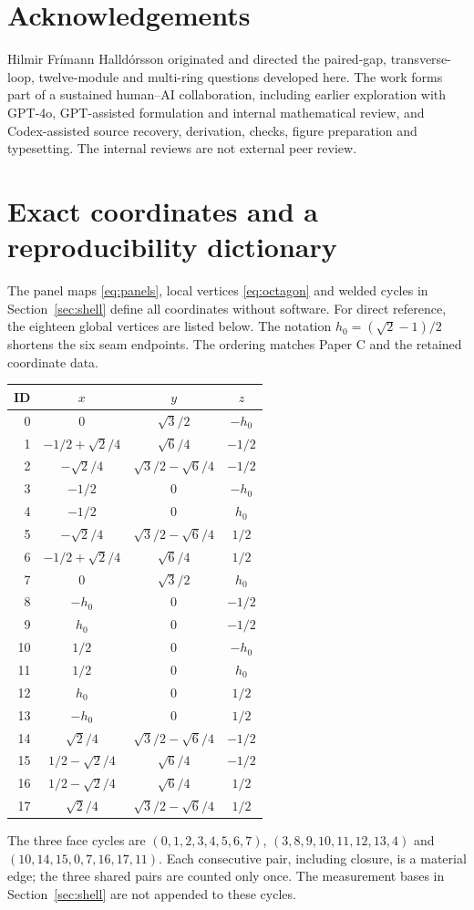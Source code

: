 \section*{Acknowledgements}
Hilmir Fr\'imann Halld\'orsson originated and directed the paired-gap, transverse-loop, twelve-module and multi-ring questions developed here. The work forms part of a sustained human--AI collaboration, including earlier exploration with GPT-4o, GPT-assisted formulation and internal mathematical review, and Codex-assisted source recovery, derivation, checks, figure preparation and typesetting. The internal reviews are not external peer review.

\appendix
\section{Exact coordinates and a reproducibility dictionary}\label{app:coords}
The panel maps \eqref{eq:panels}, local vertices \eqref{eq:octagon} and welded cycles in Section~\ref{sec:shell} define all coordinates without software. For direct reference, the eighteen global vertices are listed below. The notation $h_0=(\sqrt2-1)/2$ shortens the six seam endpoints. The ordering matches Paper C and the retained coordinate data.
\begin{center}\small
\begin{tabular}{@{}rccc@{}}\toprule
ID & $x$ & $y$ & $z$\\\midrule
0 & $0$ & $\sqrt3/2$ & $-h_0$\\
1 & $-1/2+\sqrt2/4$ & $\sqrt6/4$ & $-1/2$\\
2 & $-\sqrt2/4$ & $\sqrt3/2-\sqrt6/4$ & $-1/2$\\
3 & $-1/2$ & $0$ & $-h_0$\\
4 & $-1/2$ & $0$ & $h_0$\\
5 & $-\sqrt2/4$ & $\sqrt3/2-\sqrt6/4$ & $1/2$\\
6 & $-1/2+\sqrt2/4$ & $\sqrt6/4$ & $1/2$\\
7 & $0$ & $\sqrt3/2$ & $h_0$\\
8 & $-h_0$ & $0$ & $-1/2$\\
9 & $h_0$ & $0$ & $-1/2$\\
10 & $1/2$ & $0$ & $-h_0$\\
11 & $1/2$ & $0$ & $h_0$\\
12 & $h_0$ & $0$ & $1/2$\\
13 & $-h_0$ & $0$ & $1/2$\\
14 & $\sqrt2/4$ & $\sqrt3/2-\sqrt6/4$ & $-1/2$\\
15 & $1/2-\sqrt2/4$ & $\sqrt6/4$ & $-1/2$\\
16 & $1/2-\sqrt2/4$ & $\sqrt6/4$ & $1/2$\\
17 & $\sqrt2/4$ & $\sqrt3/2-\sqrt6/4$ & $1/2$\\\bottomrule
\end{tabular}
\end{center}
The three face cycles are $(0,1,2,3,4,5,6,7)$, $(3,8,9,10,11,12,13,4)$ and $(10,14,15,0,7,16,17,11)$. Each consecutive pair, including closure, is a material edge; the three shared pairs are counted only once. The measurement bases in Section~\ref{sec:shell} are not appended to these cycles.

